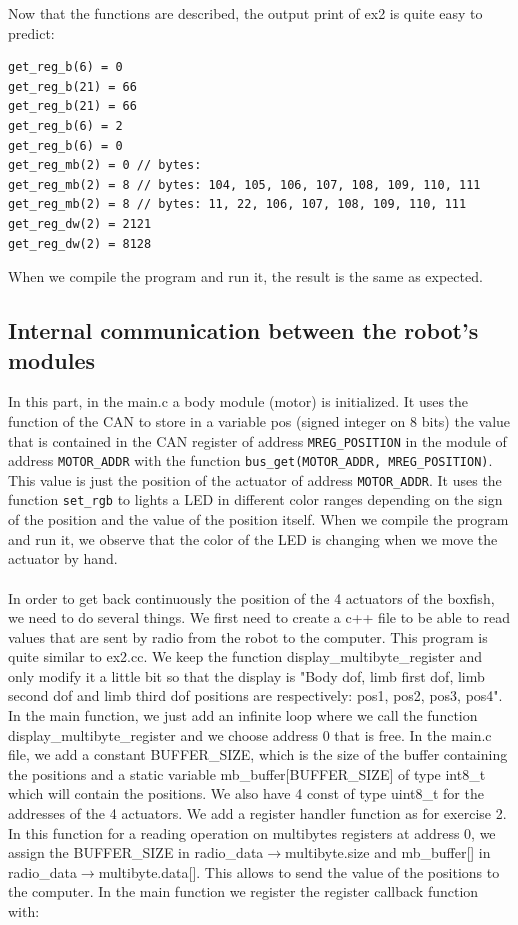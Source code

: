 \documentclass[11pt]{article}
\begin{document}
Now that the functions are described, the output print of ex2 is quite easy to predict:

\begin{verbatim}
get_reg_b(6) = 0 
get_reg_b(21) = 66
get_reg_b(21) = 66
get_reg_b(6) = 2
get_reg_b(6) = 0
get_reg_mb(2) = 0 // bytes:
get_reg_mb(2) = 8 // bytes: 104, 105, 106, 107, 108, 109, 110, 111
get_reg_mb(2) = 8 // bytes: 11, 22, 106, 107, 108, 109, 110, 111
get_reg_dw(2) = 2121
get_reg_dw(2) = 8128
\end{verbatim}

When we compile the program and run it, the result is the same as expected.



\subsection{Internal communication between the robot's modules}

In this part, in the main.c a body module (motor) is initialized. It uses the function of the CAN to store in a variable pos (signed integer on 8 bits) the value that is contained in the CAN register of address \texttt{MREG\_POSITION} in the module of address \texttt{MOTOR\_ADDR} with the function \texttt{bus\_get(MOTOR\_ADDR, MREG\_POSITION)}. This value is just the position of the actuator of address \texttt{MOTOR\_ADDR}. It uses the function \texttt{set\_rgb} to lights a LED in different color ranges depending on the sign of the position and the value of the position itself. When we compile the program and run it, we observe that the color of the LED is changing when we move the actuator by hand.
\\
\\
In order to get back continuously the position of the 4 actuators of the boxfish, we need to do several things. We first need to create a c++ file to be able to read values that are sent by radio from the robot to the computer. This program is quite similar to ex2.cc. We keep the function display\_multibyte\_register and only modify it a little bit so that the display is "Body dof, limb first dof, limb second dof and limb third dof positions are respectively: pos1, pos2, pos3, pos4". In the main function, we just add an infinite loop where we call the function display\_multibyte\_register and we choose address 0 that is free. In the main.c file, we add a constant BUFFER\_SIZE, which is the size of the buffer containing the positions and a static variable mb\_buffer[BUFFER\_SIZE] of type int8\_t which will contain the positions. We also have 4 const of type uint8\_t for the addresses of the 4 actuators. We add a register handler function as for exercise 2. In this function for a reading operation on multibytes registers at address 0, we assign the BUFFER\_SIZE in radio\_data${\rightarrow}$multibyte.size and mb\_buffer[] in radio\_data${\rightarrow}$multibyte.data[]. This allows to send the value of the positions to the computer. In the main function we register the register callback function with:
\end{document}
